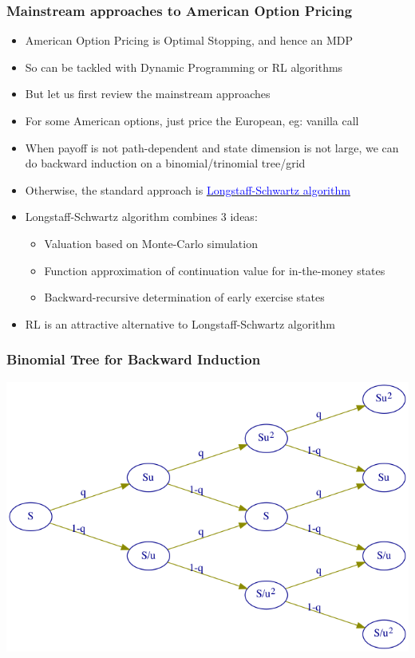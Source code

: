 \documentclass[handout]{beamer}
\begin{document}
\begin{frame}
\frametitle{Mainstream approaches to American Option Pricing}
\pause
\begin{itemize}[<+->]
\item American Option Pricing is Optimal Stopping, and hence an MDP
\item So can be tackled with Dynamic Programming or RL algorithms
\item But let us first review the mainstream approaches
\item For some American options, just price the European, eg: vanilla call
\item When payoff is not path-dependent and state dimension is not large, we can do backward induction on a binomial/trinomial tree/grid
\item Otherwise, the standard approach is \href{https://people.math.ethz.ch/~hjfurrer/teaching/LongstaffSchwartzAmericanOptionsLeastSquareMonteCarlo.pdf}{\underline{\textcolor{blue}{Longstaff-Schwartz algorithm}}}
\item Longstaff-Schwartz algorithm combines 3 ideas:
\begin{itemize}
\item Valuation based on Monte-Carlo simulation
\item Function approximation of continuation value for in-the-money states
\item Backward-recursive determination of early exercise states
\end{itemize}
\item RL is an attractive alternative to Longstaff-Schwartz algorithm
\end{itemize}
\end{frame}

\begin{frame}
\frametitle{Binomial Tree for Backward Induction}
\includegraphics[scale=0.4]{binomial_tree.png}
\end{frame}
\end{document}
